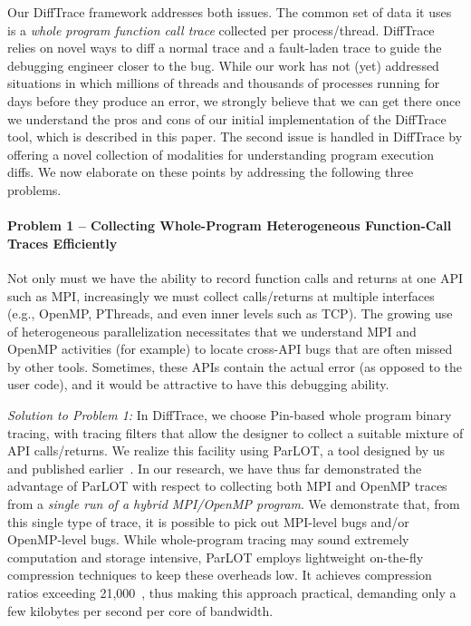 Our DiffTrace framework addresses both issues.
%
The common set of data it uses is a {\em whole program
function call trace} collected per process/thread.
%
DiffTrace relies on
novel ways to diff a normal trace and a fault-laden trace to guide the
debugging engineer closer to the bug.
%
While our work has not (yet) addressed situations in
which millions of threads and thousands of processes running
for days before they produce an error,
we strongly believe that we can get there
once we understand the pros and cons of our initial
implementation of the DiffTrace tool, which is described in this paper.
%
The second issue is handled in DiffTrace by offering a novel
collection of modalities for understanding program execution diffs.
%
We now elaborate on these points by addressing the following three problems.



\paragraph{Problem 1 -- Collecting Whole-Program Heterogeneous Function-Call Traces
Efficiently\/} Not only must we have the ability
to record function calls and returns at one
API such as MPI, increasingly we must collect calls/returns at multiple
interfaces (e.g., OpenMP, PThreads, and even inner levels such as TCP).
%
The growing use of heterogeneous parallelization necessitates that we 
understand MPI and OpenMP activities (for example) to locate cross-API
bugs that are often missed by other tools.
%
Sometimes, these APIs contain the actual error (as opposed to the user code), and it would be attractive to have this debugging ability.


{\em Solution to Problem 1:\/}
In DiffTrace, we choose Pin-based whole program binary tracing, with
tracing filters that allow the designer to collect a suitable mixture of API
calls/returns.
%
We realize this facility using
ParLOT, a tool designed by us and published earlier~\cite{parlot}.
%
In our research, we have thus far demonstrated the advantage of
ParLOT with respect to collecting both MPI and OpenMP traces
from a {\em single run of a hybrid MPI/OpenMP program}.
%
We demonstrate that, from this single type of trace, it is possible
to pick out MPI-level bugs and/or OpenMP-level bugs.
%
While whole-program tracing
may sound extremely computation and storage intensive, ParLOT employs
lightweight on-the-fly compression techniques to keep these overheads low.
%
It achieves compression ratios exceeding 21,000~\cite{parlot},
thus making this approach practical, demanding
only a few kilobytes per second per core of bandwidth.


